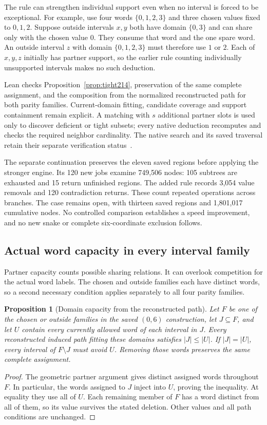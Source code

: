 \documentclass[11pt,a4paper]{article}
\newtheorem{proposition}[theorem]{Proposition}
\theoremstyle{definition}
\theoremstyle{remark}
\begin{document}
The rule can strengthen individual support even when no interval is
forced to be exceptional. For example, use four words $\{0,1,2,3\}$
and three chosen values fixed to $0,1,2$. Suppose outside intervals
$x,y$ both have domain $\{0,3\}$ and can share only with the chosen
value $0$. They consume that word and the one spare word. An outside
interval $z$ with domain $\{0,1,2,3\}$ must therefore use $1$ or $2$.
Each of $x,y,z$ initially has partner support, so the earlier rule
counting individually unsupported intervals makes no such deduction.

Lean checks Proposition~\ref{prop:tight214}, preservation of the
same complete assignment, and the composition from the normalized
reconstructed path for both parity families. Current-domain fitting,
candidate coverage and support containment remain explicit.
A matching with $s$ additional partner slots
is used only to discover deficient or tight subsets; every native
deduction recomputes and checks the required neighbor cardinality.
The native search and its saved traversal retain their separate
verification status~\cite{research214}.

The separate continuation preserves the eleven saved regions before
applying the stronger engine. Its 120 new jobs examine 749,506 nodes:
105 subtrees are exhausted and 15 return unfinished regions. The added
rule records 3,054 value removals and 120 contradiction returns.
These count repeated operations across branches. The case remains
open, with thirteen saved regions and 1,801,017 cumulative nodes.
No controlled comparison establishes a speed improvement, and no new
snake or complete six-coordinate exclusion follows.


\subsection{Actual word capacity in every interval family}
\label{sec:word215}
Partner capacity counts possible sharing relations. It can overlook
competition for the actual word labels. The chosen and outside
families each have distinct words, so a second necessary condition
applies separately to all four parity families.

\begin{proposition}[Domain capacity from the reconstructed path]\label{prop:word215}
Let $F$ be one of the chosen or outside families in the saved $(0,6)$
construction, let $J\subseteq F$, and let $U$ contain every currently
allowed word of each interval in $J$. Every reconstructed induced
path fitting these domains satisfies $|J|\le |U|$.
If $|J|=|U|$, every interval of $F\setminus J$ must avoid $U$.
Removing those words preserves the same complete assignment.
\end{proposition}
\begin{proof}
The geometric partner argument gives distinct assigned words throughout
$F$. In particular, the words assigned to $J$ inject into $U$, proving
the inequality. At equality they use all of $U$. Each remaining member
of $F$ has a word distinct from all of them, so its value survives
the stated deletion. Other values and all path conditions are unchanged.
\end{proof}
\end{document}
